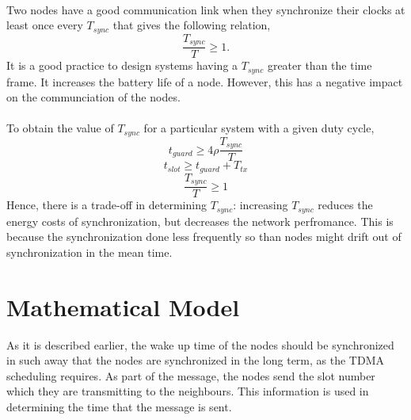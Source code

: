 \documentclass[a4paper,10pt]{report}
\begin{document}
\paragraph*{}
Two nodes have a good communication link when they synchronize their clocks at least once every $T_{sync}$ that gives the following
relation,
\begin{equation}
\frac{T_{sync}}{T}\geq 1.
\end{equation}
It is a good practice to design systems having a $T_{sync}$ greater than the time frame. It increases the battery life of a node. However,
this has a negative impact on the communciation of the nodes.
\paragraph*{}
To obtain the value of $T_{sync}$ for a particular system with a given duty cycle,
\begin{equation}
t_{guard} \geq 4\rho \frac{T_{sync}}{T}
\end{equation}
\begin{equation}
t_{slot} \geq t_{guard} + T_{tx}
\end{equation}
\begin{equation}
\frac{T_{sync}}{T} \geq 1
\end{equation}
Hence, there is a trade-off in determining $T_{sync}$: increasing $T_{sync}$ reduces the energy costs of synchronization, but decreases the network perfromance. This is because the synchronization done less frequently so than nodes might drift out of synchronization in the mean time.
\section{\textbf{Mathematical Model}}
As it is described earlier, the wake up time of the nodes should be synchronized in such away that the nodes are synchronized in the
long term, as the TDMA scheduling requires. As part of the message, the nodes send the slot number which they are transmitting to the neighbours. This information is used in determining the time that the message is sent.
\end{document}
